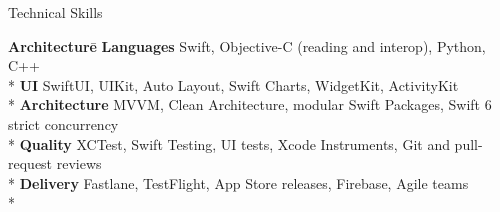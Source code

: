 \begin{resume_section}{Technical Skills}
  \begin{nospacetabbing}
  \textbf{Architecture}\quad \= \kill
  \textbf{Languages} \> Swift, Objective-C (reading and interop), Python, C++ \\*
  \textbf{UI} \> SwiftUI, UIKit, Auto Layout, Swift Charts, WidgetKit, ActivityKit \\*
  \textbf{Architecture} \> MVVM, Clean Architecture, modular Swift Packages, Swift 6 strict concurrency \\*
  \textbf{Quality} \> XCTest, Swift Testing, UI tests, Xcode Instruments, Git and pull-request reviews \\*
  \textbf{Delivery} \> Fastlane, TestFlight, App Store releases, Firebase, Agile teams \\*
  \end{nospacetabbing}
\end{resume_section}
